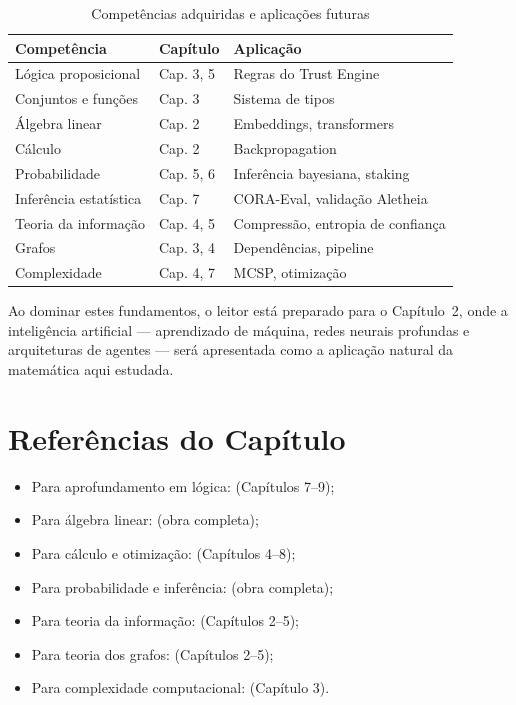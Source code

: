 \begin{table}[htb]
    \centering
    \caption{Competências adquiridas e aplicações futuras}
    \label{tab:competencias}
    \begin{tabular}{lll}
        \toprule
        \textbf{Competência} & \textbf{Capítulo} & \textbf{Aplicação} \\
        \midrule
        Lógica proposicional & Cap. 3, 5 & Regras do Trust Engine \\
        Conjuntos e funções & Cap. 3 & Sistema de tipos \\
        Álgebra linear & Cap. 2 & Embeddings, transformers \\
        Cálculo & Cap. 2 & Backpropagation \\
        Probabilidade & Cap. 5, 6 & Inferência bayesiana, staking \\
        Inferência estatística & Cap. 7 & CORA-Eval, validação Aletheia \\
        Teoria da informação & Cap. 4, 5 & Compressão, entropia de confiança \\
        Grafos & Cap. 3, 4 & Dependências, pipeline \\
        Complexidade & Cap. 4, 7 & MCSP, otimização \\
        \bottomrule
    \end{tabular}
\end{table}

Ao dominar estes fundamentos, o leitor está preparado para o Capítulo~2,
onde a inteligência artificial --- aprendizado de máquina, redes neurais
profundas e arquiteturas de agentes --- será apresentada como a aplicação
natural da matemática aqui estudada.

\section*{Referências do Capítulo}

\begin{itemize}
    \item Para aprofundamento em lógica: \cite{russell2020inteligencia}
          (Capítulos 7--9);
    \item Para álgebra linear: \cite{strang2016algebra}
          (obra completa);
    \item Para cálculo e otimização: \cite{goodfellow2016deep}
          (Capítulos 4--8);
    \item Para probabilidade e inferência: \cite{wasserman2004all}
          (obra completa);
    \item Para teoria da informação: \cite{cover2006elements}
          (Capítulos 2--5);
    \item Para teoria dos grafos: \cite{barabasi2016network}
          (Capítulos 2--5);
    \item Para complexidade computacional: \cite{russell2020inteligencia}
          (Capítulo 3).
\end{itemize}

